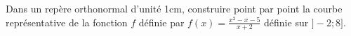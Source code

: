 
Dans un repère orthonormal d'unité 1cm, construire point par point la courbe représentative de la fonction $f$ définie par $f(x)=\frac{x^2-x-5}{x+2}$ définie sur $]-2;8]$.
